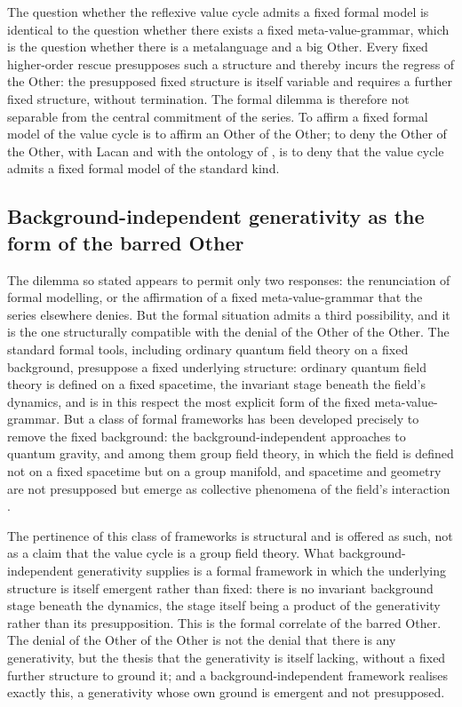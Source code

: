 \begin{claim}
The question whether the reflexive value cycle admits a fixed formal model is identical to the question whether there exists a fixed meta-value-grammar, which is the question whether there is a metalanguage and a big Other. Every fixed higher-order rescue presupposes such a structure and thereby incurs the regress of the Other: the presupposed fixed structure is itself variable and requires a further fixed structure, without termination. The formal dilemma is therefore not separable from the central commitment of the series. To affirm a fixed formal model of the value cycle is to affirm an Other of the Other; to deny the Other of the Other, with Lacan and with the ontology of , is to deny that the value cycle admits a fixed formal model of the standard kind.
\end{claim}

\subsection{Background-independent generativity as the form of the barred Other}
\label{p10:sec:mod-gft}

The dilemma so stated appears to permit only two responses: the renunciation of formal modelling, or the affirmation of a fixed meta-value-grammar that the series elsewhere denies. But the formal situation admits a third possibility, and it is the one structurally compatible with the denial of the Other of the Other. The standard formal tools, including ordinary quantum field theory on a fixed background, presuppose a fixed underlying structure: ordinary quantum field theory is defined on a fixed spacetime, the invariant stage beneath the field's dynamics, and is in this respect the most explicit form of the fixed meta-value-grammar. But a class of formal frameworks has been developed precisely to remove the fixed background: the background-independent approaches to quantum gravity, and among them group field theory, in which the field is defined not on a fixed spacetime but on a group manifold, and spacetime and geometry are not presupposed but emerge as collective phenomena of the field's interaction \parencite{oriti2012,oriti2014,rovelli2004}.

The pertinence of this class of frameworks is structural and is offered as such, not as a claim that the value cycle is a group field theory. What background-independent generativity supplies is a formal framework in which the underlying structure is itself emergent rather than fixed: there is no invariant background stage beneath the dynamics, the stage itself being a product of the generativity rather than its presupposition. This is the formal correlate of the barred Other. The denial of the Other of the Other is not the denial that there is any generativity, but the thesis that the generativity is itself lacking, without a fixed further structure to ground it; and a background-independent framework realises exactly this, a generativity whose own ground is emergent and not presupposed.

